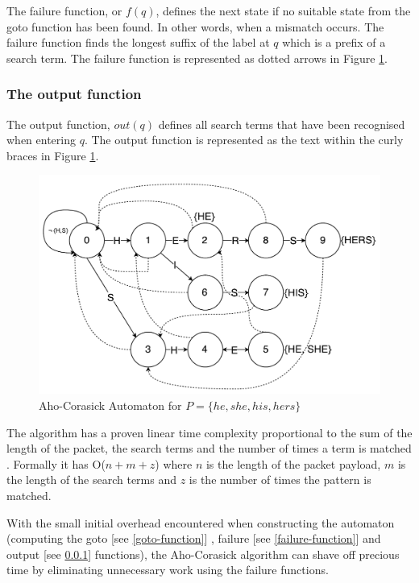 \documentclass{article}
\begin{document}
The failure function, or \(f(q)\), defines the next state if no suitable state from the goto function has been found. In other words, when a mismatch occurs. The failure function finds the longest suffix of the label at \(q\) which is a prefix of a search term. The failure function is represented as dotted arrows in Figure \ref{fig:automaton}.

\subsubsection{The output function} \label{output-function}

The output function, \(out(q)\) defines all search terms that have been recognised when entering \(q\). The output function is represented as the text within the curly braces in Figure \ref{fig:automaton}.

\begin{figure}[h!bt]
  
  \centering
  \makeatletter
  \includegraphics[width=\textwidth]{images/ac-automaton}
  \caption{Aho-Corasick Automaton for \(P = \{he, she, his, hers\}\)}
  \label{fig:automaton}
\end{figure}

The algorithm has a proven linear time complexity proportional to the sum of the length of the packet, the search terms and the number of times a term is matched \citep{Aho1975}. Formally it has O(\(n + m + z\)) where \(n\) is the length of the packet payload, \(m\) is the length of the search terms and \(z\) is the number of times the pattern is matched.

With the small initial overhead encountered when constructing the automaton (computing the goto [see \ref{goto-function}] , failure [see \ref{failure-function}] and output [see \ref{output-function}] functions), the Aho-Corasick algorithm can shave off precious time by eliminating unnecessary work using the failure functions.
\end{document}

